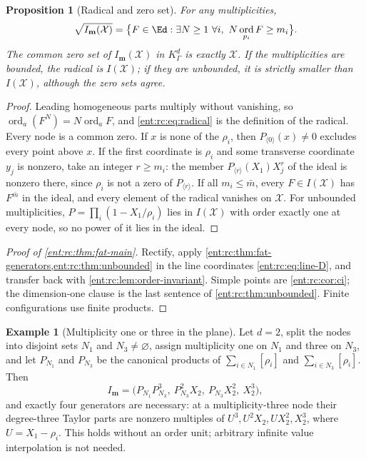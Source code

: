 \documentclass[11pt]{article}
\theoremstyle{plain}
\theoremstyle{plain}
\newtheorem{proposition}[proposition]{Proposition}
\theoremstyle{plain}
\theoremstyle{definition}
\theoremstyle{definition}
\theoremstyle{definition}
\newtheorem{example}[example]{Example}
\theoremstyle{definition}
\theoremstyle{remark}
\newcommand{\K}{K_\Gamma}\newcommand{\KD}{K_\Delta}
\DeclareMathOperator{\ord}{ord}\DeclareMathOperator{\cf}{cf}
\begin{document}
\begin{proposition}[Radical and zero set]\label{ent:rc:prop:radical}
For any multiplicities,
\begin{equation}\label{ent:rc:eq:radical}
 \sqrt{I_{\mathbf m}(\mathcal X)}=
 \bigl\{F\in\Ed:\exists N\ge1\ \forall i,\ N\ord_{p_i}F\ge m_i\bigr\}.
\end{equation}
The common zero set of $I_{\mathbf m}(\mathcal X)$ in $\K^d$ is exactly
$\mathcal X$. If the multiplicities are bounded, the radical is
$I(\mathcal X)$; if they are unbounded, it is strictly smaller than
$I(\mathcal X)$, although the zero sets agree.
\end{proposition}
\begin{proof}
Leading homogeneous parts multiply without vanishing, so
$\ord_a(F^N)=N\ord_aF$, and \eqref{ent:rc:eq:radical} is the definition of the
radical. Every node is a common zero. If $x$ is none of the $\rho_i$, then
$P_{\langle0\rangle}(x)\ne0$ excludes every point above $x$. If the first
coordinate is $\rho_i$ and some transverse coordinate $y_j$ is nonzero, take
an integer $r\ge m_i$: the member $P_{\langle r\rangle}(X_1)X_j^r$ of the ideal
is nonzero there, since $\rho_i$ is not a zero of $P_{\langle r\rangle}$. If
all $m_i\le\bar m$, every $F\in I(\mathcal X)$ has $F^{\bar m}$ in the ideal,
and every element of the radical vanishes on $\mathcal X$. For unbounded
multiplicities, $P=\prod_i(1-X_1/\rho_i)$ lies in $I(\mathcal X)$ with order
exactly one at every node, so no power of it lies in the ideal.
\end{proof}

\begin{proof}[Proof of \cref{ent:rc:thm:fat-main}]
Rectify, apply \cref{ent:rc:thm:fat-generators,ent:rc:thm:unbounded} in the
line coordinates \eqref{ent:rc:eq:line-D}, and transfer back with
\cref{ent:rc:lem:order-invariant}. Simple points are
\cref{ent:rc:cor:ci}; the dimension-one clause is the last sentence of
\cref{ent:rc:thm:unbounded}. Finite configurations use finite products.
\end{proof}

\begin{example}[Multiplicity one or three in the plane]
\label{ent:rc:ex:planar}
Let $d=2$, split the nodes into disjoint sets $N_1$ and $N_3\ne\varnothing$,
assign multiplicity one on $N_1$ and three on $N_3$, and let $P_{N_1}$ and
$P_{N_3}$ be the canonical products of $\sum_{i\in N_1}[\rho_i]$ and
$\sum_{i\in N_3}[\rho_i]$. Then
\begin{equation}\label{ent:rc:eq:example13}
 I_{\mathbf m}=\bigl(P_{N_1}P_{N_3}^3,\ P_{N_3}^2X_2,\ P_{N_3}X_2^2,\
 X_2^3\bigr),
\end{equation}
and exactly four generators are necessary: at a multiplicity-three node their
degree-three Taylor parts are nonzero multiples of $U^3,U^2X_2,UX_2^2,X_2^3$,
where $U=X_1-\rho_i$. This holds without an order unit; arbitrary infinite
value interpolation is not needed.
\end{example}
\end{document}
